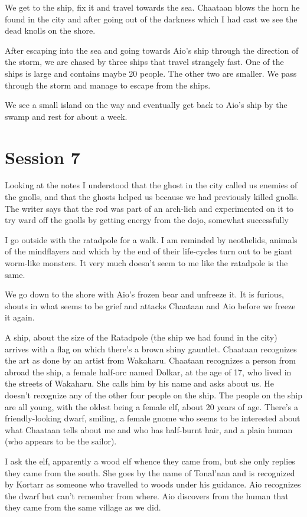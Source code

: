 \documentclass[10pt,a4paper,twoside,openany,hidelinks]{book}
\begin{document}
We get to the ship, fix it and travel towards the sea. Chaataan blows the horn he found in the city and after going out of the darkness which I had cast we see the dead knolls on the shore.

After escaping into the sea and going towards Aio's ship through the direction of the storm, we are chased by three ships that travel strangely fast. One of the ships is large and contains maybe 20 people. The other two are smaller. We pass through the storm and manage to escape from the ships.

We see a small island on the way and eventually get back to Aio's ship by the swamp and rest for about a week.

\chapter*{Session 7}

Looking at the notes I understood that the ghost in the city called us enemies of the gnolls, and that the ghosts helped us because we had previously killed gnolls. The writer says that the rod was part of an arch-lich and experimented on it to try ward off the gnolls by getting energy from the dojo, somewhat successfully

I go outside with the ratadpole for a walk. I am reminded by neothelids, animals of the mindflayers and which by the end of their life-cycles turn out to be giant worm-like monsters. It very much doesn't seem to me like the ratadpole is the same.

We go down to the shore with Aio's frozen bear and unfreeze it. It is furious, shouts in what seems to be grief and attacks Chaataan and Aio before we freeze it again.

A ship, about the size of the Ratadpole (the ship we had found in the city) arrives with a flag on which there's a brown shiny gauntlet. Chaataan recognizes the art as done by an artist from Wakaharu. Chaataan recognizes a person from abroad the ship, a female half-orc named Dolkar, at the age of 17, who lived in the streets of Wakaharu. She calls him by his name and asks about us. He doesn't recognize any of the other four people on the ship. The people on the ship are all young, with the oldest being a female elf, about 20 years of age. There's a friendly-looking dwarf, smiling, a female gnome who seems to be interested about what Chaataan tells about me and who has half-burnt hair, and a plain human (who appears to be the sailor).

I ask the elf, apparently a wood elf whence they came from, but she only replies they came from the south. She goes by the name of Tonal'nan and is recognized by Kortarr as someone who travelled to woods under his guidance. Aio recognizes the dwarf but can't remember from where. Aio discovers from the human that they came from the same village as we did. 
\end{document}
